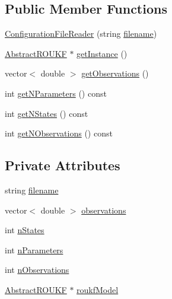 \subsection*{Public Member Functions}
\begin{DoxyCompactItemize}
\item 
\mbox{\hyperlink{classConfigurationFileReader_ad85a4de7a5b87fcddb1c27de9b3ef332}{Configuration\+File\+Reader}} (string \mbox{\hyperlink{classConfigurationFileReader_a007ec73fe536b697bd200a6b0c66f6e6}{filename}})
\item 
\mbox{\hyperlink{classAbstractROUKF}{Abstract\+R\+O\+U\+KF}} $\ast$ \mbox{\hyperlink{classConfigurationFileReader_a2bea7f730d5caf67b9d3e1bf45072542}{get\+Instance}} ()
\item 
vector$<$ double $>$ \mbox{\hyperlink{classConfigurationFileReader_a1aa7cc335474bd1d15600f93e6de392b}{get\+Observations}} ()
\item 
int \mbox{\hyperlink{classConfigurationFileReader_a3d3b4191df51eb5e560716bc5e034f8a}{get\+N\+Parameters}} () const
\item 
int \mbox{\hyperlink{classConfigurationFileReader_a861fef6643dbc48d92b1eb18305a3931}{get\+N\+States}} () const
\item 
int \mbox{\hyperlink{classConfigurationFileReader_aaf21e598e8fcf28ed762af515946aef1}{get\+N\+Observations}} () const
\end{DoxyCompactItemize}
\subsection*{Private Attributes}
\begin{DoxyCompactItemize}
\item 
string \mbox{\hyperlink{classConfigurationFileReader_a007ec73fe536b697bd200a6b0c66f6e6}{filename}}
\item 
vector$<$ double $>$ \mbox{\hyperlink{classConfigurationFileReader_a556af8eae012e9d7528cbe1fd0e508d0}{observations}}
\item 
int \mbox{\hyperlink{classConfigurationFileReader_ad8cae04fc2c6832bb07446ca87803977}{n\+States}}
\item 
int \mbox{\hyperlink{classConfigurationFileReader_a669b280cc5bc410dba130ee9f14e9cac}{n\+Parameters}}
\item 
int \mbox{\hyperlink{classConfigurationFileReader_a5f6e229fb0ad9c7259a71977c7ead9b3}{n\+Observations}}
\item 
\mbox{\hyperlink{classAbstractROUKF}{Abstract\+R\+O\+U\+KF}} $\ast$ \mbox{\hyperlink{classConfigurationFileReader_a962e727eb22a7ff8d6f4b5a37cbb6a47}{roukf\+Model}}
\end{DoxyCompactItemize}


